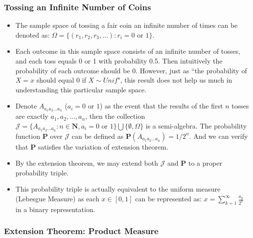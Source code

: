 \documentclass[handout]{beamer}
\newcommand{\BP}{\mathbf{P}}
\begin{document}
\frame
{
  \frametitle{Tossing an Infinite Number of Coins}

   \begin{itemize}
        
            \item<1-> The sample space of tossing a fair coin an infinite number of times can be denoted as: $\Omega=\{(r_1, r_2, r_3,\ldots): r_i=0 \text{ or } 1\}$.            
                   
    \item<2-> Each outcome in this sample space consists of an infinite number of tosses, and each toss equals 0 or 1 with probability 0.5. Then intuitively the probability of each outcome should be 0. However, just as ``the probability of $X=x$ should equal 0 if $X\sim Unif$", this result does not help us much in understanding this particular sample space. 
        
 \item<3->  Denote $A_{a_1a_2\ldots a_n}$ ($a_i= 0 \text{ or } 1 $) as the event that the results of the first $n$ tosses are exactly $a_1,a_2, \ldots, a_n$, then the collection $\mathcal{J}=\{A_{a_1a_2\ldots a_n}: n\in \mathbf{N}, a_i= 0 \text{ or } 1 \} \bigcup \{\emptyset, \Omega\}$ is a semi-algebra. The probability function $\BP$ over $\mathcal{J}$ can be defined as $\BP(A_{a_1a_2\ldots a_n})=1/2^n$. And we can verify that $\BP$ satisfies the variation of extension theorem.
          \item<5-> By the extension theorem, we may extend both $\mathcal{J}$  and  $\BP$ to a proper probability triple. 
                       \item<6-> This probability triple is actually equivalent to the uniform measure (Lebesgue Measure) as each $x\in [0,1]$ can be represented as: $x=\sum_{k=1}^{\infty} \frac{a_k}{2^k}$ in a binary representation.  

                   \end{itemize}

}


\subsubsection{Extension Theorem: Product Measure}
\end{document}
